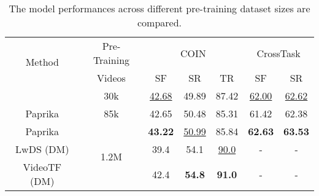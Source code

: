 \begin{table}[t]
    \centering
    \caption{The model performances across different pre-training dataset sizes are compared.}
    \begin{tabular}{c c|c c c|c c}
        \multirow{2}{*}{Method} & Pre-Training & \multicolumn{3}{|c|}{COIN} & \multicolumn{2}{|c}{CrossTask} \\
        & Videos & SF & SR & TR & SF & SR \\
        \hline
        \model{} & 30k & \underline{42.68} & 49.89 & 87.42 & \underline{62.00} &\underline{62.62} \\
        Paprika & 85k & 42.65 & 50.48 & 85.31 & 61.42 & 62.38 \\
        \hline
        Paprika & \multirow{3}{*}{1.2M} & \textbf{43.22} & \underline{50.99} & 85.84 & \textbf{62.63} & \textbf{63.53} \\
        LwDS (DM) & & 39.4 & 54.1 & \underline{90.0} & - & - \\
        VideoTF (DM) & & 42.4 & \textbf{54.8} & \textbf{91.0} & - & - \\
    \end{tabular}
    \label{tab:data_efficiency}
\end{table}